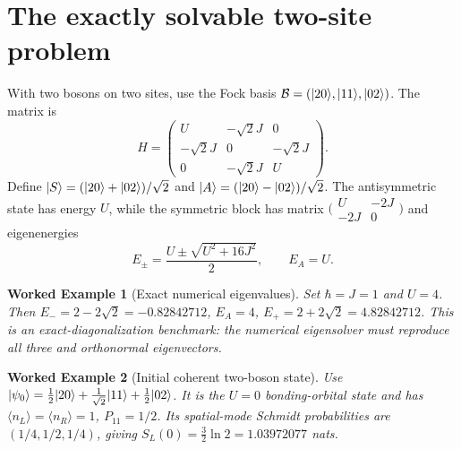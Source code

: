 \documentclass[11pt,a4paper]{article}
\newtheorem{example}{Worked Example}\newtheorem{remark}{Qualification}\newtheorem{proposition}{Proposition}
\begin{document}
\section{The exactly solvable two-site problem}
With two bosons on two sites, use the Fock basis $\mathcal B=(|20\rangle,|11\rangle,|02\rangle)$. The matrix is
\begin{equation}\label{eq:H}
H=\begin{pmatrix}U&-\sqrt2J&0\\-\sqrt2J&0&-\sqrt2J\\0&-\sqrt2J&U\end{pmatrix}.
\end{equation}
Define $|S\rangle=(|20\rangle+|02\rangle)/\sqrt2$ and $|A\rangle=(|20\rangle-|02\rangle)/\sqrt2$. The antisymmetric state has energy $U$, while the symmetric block has matrix $\bigl(\begin{smallmatrix}U&-2J\\-2J&0\end{smallmatrix}\bigr)$ and eigenenergies
\begin{equation}\label{eq:spectrum}E_\pm=\frac{U\pm\sqrt{U^2+16J^2}}2,\qquad E_A=U.\end{equation}
\begin{example}[Exact numerical eigenvalues]
Set $\hbar=J=1$ and $U=4$. Then $E_- =2-2\sqrt2=-0.82842712$, $E_A=4$, $E_+=2+2\sqrt2=4.82842712$. This is an exact-diagonalization benchmark: the numerical eigensolver must reproduce all three and orthonormal eigenvectors.
\end{example}
\begin{example}[Initial coherent two-boson state]
Use $|\psi_0\rangle=\frac12|20\rangle+\frac1{\sqrt2}|11\rangle+\frac12|02\rangle$. It is the $U=0$ bonding-orbital state and has $\langle n_L\rangle=\langle n_R\rangle=1$, $P_{11}=1/2$. Its spatial-mode Schmidt probabilities are $(1/4,1/2,1/4)$, giving $S_L(0)=\tfrac32\ln2=1.03972077$ nats.
\end{example}
\end{document}
